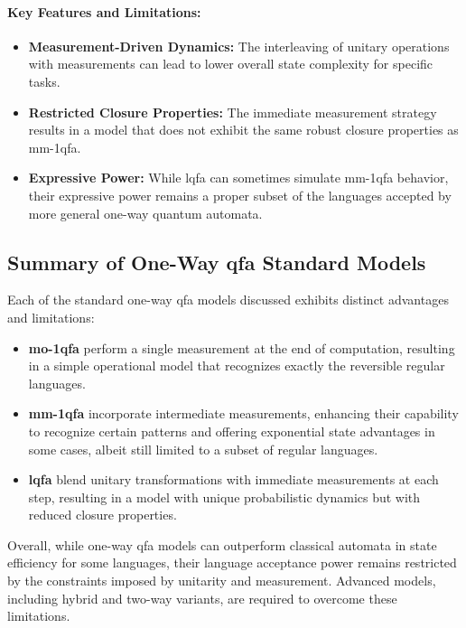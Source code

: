 \paragraph{Key Features and Limitations:}
\begin{itemize}
    \item \textbf{Measurement-Driven Dynamics:} The interleaving of unitary operations with measurements can lead to lower overall state complexity for specific tasks.
    \item \textbf{Restricted Closure Properties:} The immediate measurement strategy results in a model that does not exhibit the same robust closure properties as \gls{mm-1qfa}.
    \item \textbf{Expressive Power:} While \gls{lqfa} can sometimes simulate \gls{mm-1qfa} behavior, their expressive power remains a proper subset of the languages accepted by more general one-way quantum automata.
\end{itemize}

\subsection*{Summary of One-Way \gls{qfa} Standard Models}
Each of the standard one-way \gls{qfa} models discussed exhibits distinct advantages and limitations:
\begin{itemize}
    \item \textbf{\gls{mo-1qfa}} perform a single measurement at the end of computation, resulting in a simple operational model that recognizes exactly the reversible regular languages.
    \item \textbf{\gls{mm-1qfa}} incorporate intermediate measurements, enhancing their capability to recognize certain patterns and offering exponential state advantages in some cases, albeit still limited to a subset of regular languages.
    \item \textbf{\gls{lqfa}} blend unitary transformations with immediate measurements at each step, resulting in a model with unique probabilistic dynamics but with reduced closure properties.
\end{itemize}
Overall, while one-way \gls{qfa} models can outperform classical automata in state efficiency for some languages, their language acceptance power remains restricted by the constraints imposed by unitarity and measurement. Advanced models, including hybrid and two-way variants, are required to overcome these limitations.

